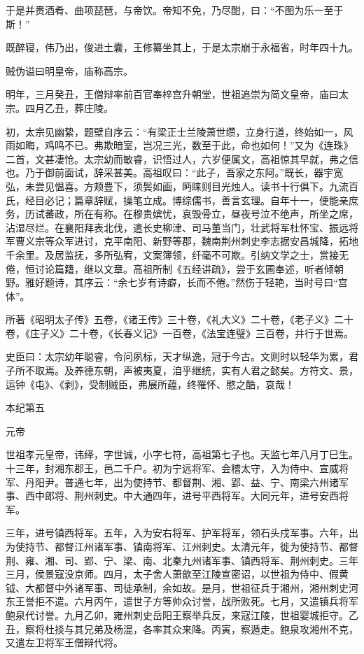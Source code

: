 \documentclass[12pt,UTF8]{ctexbook}
\begin{document}
于是并赉酒肴、曲项琵琶，与帝饮。帝知不免，乃尽酣，曰：“不图为乐一至于斯！”

既醉寝，伟乃出，俊进土囊，王修纂坐其上，于是太宗崩于永福省，时年四十九。

贼伪谥曰明皇帝，庙称高宗。

明年，三月癸丑，王僧辩率前百官奉梓宫升朝堂，世祖追崇为简文皇帝，庙曰太宗。四月乙丑，葬庄陵。

初，太宗见幽絷，题壁自序云：“有梁正士兰陵萧世缵，立身行道，终始如一，风雨如晦，鸡鸣不已。弗欺暗室，岂况三光，数至于此，命也如何！”又为《连珠》二首，文甚凄怆。太宗幼而敏睿，识悟过人，六岁便属文，高祖惊其早就，弗之信也。乃于御前面试，辞采甚美。高祖叹曰：“此子，吾家之东阿。”既长，器宇宽弘，未尝见愠喜。方颊豊下，须鬓如画，眄睐则目光烛人。读书十行俱下。九流百氏，经目必记；篇章辞赋，操笔立成。博综儒书，善言玄理。自年十一，便能亲庶务，历试蕃政，所在有称。在穆贵嫔忧，哀毁骨立，昼夜号泣不绝声，所坐之席，沾湿尽烂。在襄阳拜表北伐，遣长史柳津、司马董当门，壮武将军杜怀宝、振远将军曹义宗等众军进讨，克平南阳、新野等郡，魏南荆州刺史李志据安昌城降，拓地千余里。及居监抚，多所弘宥，文案簿领，纤毫不可欺。引纳文学之士，赏接无倦，恒讨论篇籍，继以文章。高祖所制《五经讲疏》，尝于玄圃奉述，听者倾朝野。雅好题诗，其序云：“余七岁有诗癖，长而不倦。”然伤于轻艳，当时号曰“宫体”。

所著《昭明太子传》五卷，《诸王传》三十卷，《礼大义》二十卷，《老子义》二十卷，《庄子义》二十卷，《长春义记》一百卷，《法宝连璧》三百卷，并行于世焉。

史臣曰：太宗幼年聪睿，令问夙标，天才纵逸，冠于今古。文则时以轻华为累，君子所不取焉。及养德东朝，声被夷夏，洎乎继统，实有人君之懿矣。方符文、景，运钟《屯》、《剥》，受制贼臣，弗展所蕴，终罹怀、愍之酷，哀哉！





本纪第五

元帝

世祖孝元皇帝，讳绎，字世诚，小字七符，高祖第七子也。天监七年八月丁巳生。十三年，封湘东郡王，邑二千户。初为宁远将军、会稽太守，入为侍中、宣威将军、丹阳尹。普通七年，出为使持节、都督荆、湘、郢、益、宁、南梁六州诸军事、西中郎将、荆州刺史。中大通四年，进号平西将军。大同元年，进号安西将军。

三年，进号镇西将军。五年，入为安右将军、护军将军，领石头戍军事。六年，出为使持节、都督江州诸军事、镇南将军、江州刺史。太清元年，徙为使持节、都督荆、雍、湘、司、郢、宁、梁、南、北秦九州诸军事、镇西将军、荆州刺史。三年三月，侯景寇没京师。四月，太子舍人萧歆至江陵宣密诏，以世祖为侍中、假黄钺、大都督中外诸军事、司徒承制，余如故。是月，世祖征兵于湘州，湘州刺史河东王誉拒不遣。六月丙午，遣世子方等帅众讨誉，战所败死。七月，又遣镇兵将军鲍泉代讨誉。九月乙卯，雍州刺史岳阳王察举兵反，来寇江陵，世祖婴城拒守。乙丑，察将杜掞与其兄弟及杨混，各率其众来降。丙寅，察遁走。鲍泉攻湘州不克，又遣左卫将军王僧辩代将。
\end{document}
